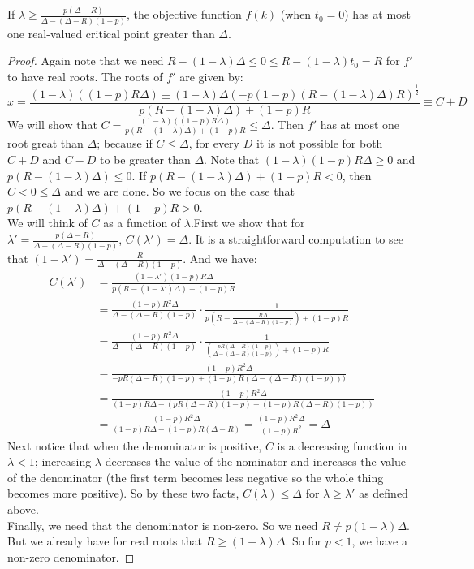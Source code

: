 \begin{lemma} If $\lambda \geq \frac{p(\Delta-R)}{\Delta-(\Delta-R)(1-p)}$, the objective function $f(k)$ (when $t_0 = 0$) has at most one real-valued critical point greater than $\Delta$. \end{lemma}
\begin{proof}
Again note that we need $R-(1-\lambda)\Delta \leq 0 \leq R-(1-\lambda)t_0 = R$ for $f'$ to have real roots. The roots of $f'$ are given by:
\begin{equation*}
x = \frac{(1-\lambda)((1-p)R\Delta) \pm (1-\lambda)\Delta(-p(1-p)(R-(1-\lambda)\Delta)R)^{\frac{1}{2}}}{p(R-(1-\lambda)\Delta)+(1-p)R} \equiv C\pm D
\end{equation*}
We will show that $C = 
\frac{(1-\lambda)((1-p)R\Delta)}{p(R-(1-\lambda)\Delta)+(1-p)R} \leq \Delta$. Then $f'$ has at most one root great than $\Delta$; because if $C \leq \Delta$, for every $D$ it is not possible for both $C+D$ and $C-D$ to be greater than $\Delta$. Note that $(1-\lambda)(1-p)R\Delta \geq 0$ and $p(R-(1-\lambda)\Delta) \leq 0$. If $p(R-(1-\lambda)\Delta)+(1-p)R < 0$, then $C < 0 \leq \Delta$ and we are done. So we focus on the case that $p(R-(1-\lambda)\Delta)+(1-p)R > 0$. \\

We will think of $C$ as a function of $\lambda$.First we show that for $\lambda' = \frac{p(\Delta-R)}{\Delta-(\Delta-R)(1-p)}$, $C(\lambda') = \Delta$. It is a straightforward computation to see that $(1-\lambda') = \frac{R}{\Delta-(\Delta-R)(1-p)}$. And we have:
\begin{align*}
C(\lambda') &= \frac{(1-\lambda')(1-p)R\Delta}{p(R-(1-\lambda')\Delta)+(1-p)R} \\
&= \frac{(1-p)R^2\Delta}{\Delta-(\Delta-R)(1-p)} \cdot \frac{1}{p\left(R-\frac{R\Delta}{\Delta-(\Delta-R)(1-p)} \right)+(1-p)R} \\
&= \frac{(1-p)R^2\Delta}{\Delta-(\Delta-R)(1-p)} \cdot \frac{1}{\left(\frac{-pR(\Delta-R)(1-p)}{\Delta-(\Delta-R)(1-p)} \right)+(1-p)R} \\
&= \frac{(1-p)R^2\Delta}{-pR(\Delta-R)(1-p)+(1-p)R(\Delta-(\Delta-R)(1-p)))} \\
&= \frac{(1-p)R^2\Delta}{(1-p)R\Delta-(pR(\Delta-R)(1-p)+(1-p)R(\Delta-R)(1-p))} \\
&= \frac{(1-p)R^2\Delta}{(1-p)R\Delta-(1-p)R(\Delta-R)} = \frac{(1-p)R^2\Delta}{(1-p)R^2} = \Delta
\end{align*}
Next notice that when the denominator is positive, $C$ is a decreasing function in $\lambda < 1$; increasing $\lambda$ decreases the value of the nominator and increases the value of the denominator (the first term becomes less negative so the whole thing becomes more positive). So by these two facts, $C(\lambda) \leq \Delta$ for $\lambda \geq \lambda'$ as defined above. \\

Finally, we need that the denominator is non-zero. So we need $R \neq p(1-\lambda)\Delta$. But we already have for real roots that $R \geq (1-\lambda)\Delta$. So for $p < 1$, we have a non-zero denominator.
\end{proof}

